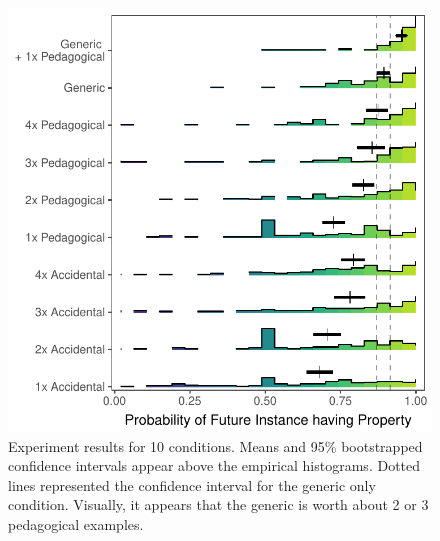 \documentclass[10pt,letterpaper]{article}
\begin{document}
\begin{figure}[t]
\begin{center}
\includegraphics[width=\linewidth]{figs/genex-pilots_10conditions_reordered.pdf}
\end{center}
\caption{Experiment results for 10 conditions. Means and 95\% bootstrapped confidence intervals appear above the empirical histograms. Dotted lines represented the confidence interval for the generic only condition. Visually, it appears that the generic is worth about 2 or 3 pedagogical examples.}
\label{fig:results}
\end{figure}
\end{document}
